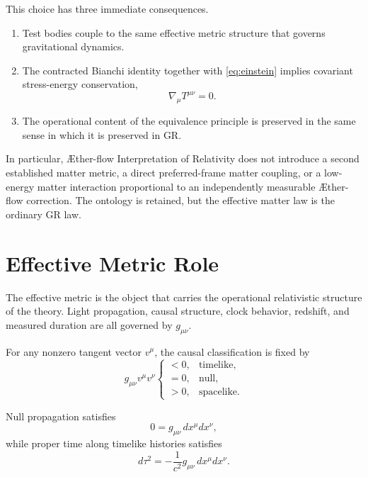 \documentclass[11pt]{article}
\newcommand{\Aflow}{\AE{}ther-flow}
\newcommand{\TheoryName}{\Aflow{} Interpretation of Relativity}
\begin{document}
This choice has three immediate consequences.
\begin{enumerate}
    \item Test bodies couple to the same effective metric structure that governs gravitational dynamics.
    \item The contracted Bianchi identity together with \eqref{eq:einstein} implies covariant stress-energy conservation,
    \begin{equation}
    \nabla_{\mu}T^{\mu\nu}=0.
    \label{eq:conservation}
    \end{equation}
    \item The operational content of the equivalence principle is preserved in the same sense in which it is preserved in GR.
\end{enumerate}

In particular, \TheoryName{} does not introduce a second established matter metric, a direct preferred-frame matter coupling, or a low-energy matter interaction proportional to an independently measurable \Aflow{} correction. The ontology is retained, but the effective matter law is the ordinary GR law.

\section{Effective Metric Role}

The effective metric is the object that carries the operational relativistic structure of the theory. Light propagation, causal structure, clock behavior, redshift, and measured duration are all governed by \(g_{\mu\nu}\).

For any nonzero tangent vector \(v^\mu\), the causal classification is fixed by
\begin{equation}
g_{\mu\nu}v^\mu v^\nu
\begin{cases}
<0, & \text{timelike},\\
=0, & \text{null},\\
>0, & \text{spacelike}.
\end{cases}
\label{eq:causalclassification}
\end{equation}

Null propagation satisfies
\begin{equation}
0=g_{\mu\nu}\,dx^{\mu}dx^{\nu},
\label{eq:null}
\end{equation}
while proper time along timelike histories satisfies
\begin{equation}
d\tau^2=-\frac{1}{c^2}g_{\mu\nu}\,dx^{\mu}dx^{\nu}.
\label{eq:propertime}
\end{equation}
\end{document}
